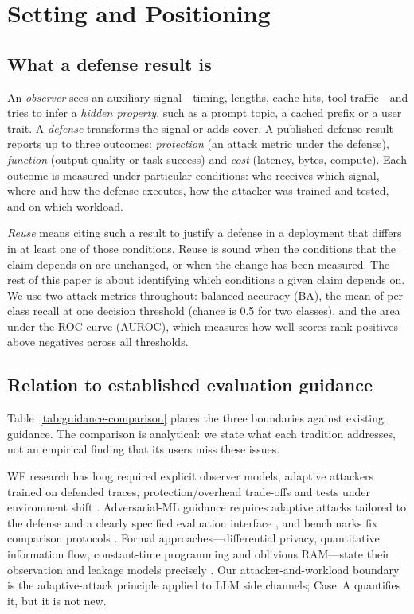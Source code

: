 \section{Setting and Positioning}\label{sec:positioning}\label{sec:background}
\subsection{What a defense result is}
An \emph{observer} sees an auxiliary signal---timing, lengths, cache hits, tool traffic---and tries to infer a \emph{hidden property}, such as a prompt topic, a cached prefix or a user trait. A \emph{defense} transforms the signal or adds cover. A published defense result reports up to three outcomes: \emph{protection} (an attack metric under the defense), \emph{function} (output quality or task success) and \emph{cost} (latency, bytes, compute). Each outcome is measured under particular conditions: who receives which signal, where and how the defense executes, how the attacker was trained and tested, and on which workload.

\emph{Reuse} means citing such a result to justify a defense in a deployment that differs in at least one of those conditions. Reuse is sound when the conditions that the claim depends on are unchanged, or when the change has been measured. The rest of this paper is about identifying which conditions a given claim depends on. We use two attack metrics throughout: balanced accuracy (BA), the mean of per-class recall at one decision threshold (chance is 0.5 for two classes), and the area under the ROC curve (AUROC), which measures how well scores rank positives above negatives across all thresholds.

\subsection{Relation to established evaluation guidance}
Table~\ref{tab:guidance-comparison} places the three boundaries against existing guidance. The comparison is analytical: we state what each tradition addresses, not an empirical finding that its users miss these issues.

WF research has long required explicit observer models, adaptive attackers trained on defended traces, protection/overhead trade-offs and tests under environment shift \cite{cai2014systematic,juarez2014critical,mathews2023critical,gong2021wfdefproxy}. Adversarial-ML guidance requires adaptive attacks tailored to the defense and a clearly specified evaluation interface \cite{carlini2019evaluating,tramer2020adaptive}, and benchmarks fix comparison protocols \cite{croce2021robustbench}. Formal approaches---differential privacy, quantitative information flow, constant-time programming and oblivious RAM---state their observation and leakage models precisely \cite{dwork2014foundations,smith2009qif,almeida2016constanttime,stefanov2013pathoram}. Our attacker-and-workload boundary is the adaptive-attack principle applied to LLM side channels; Case~A quantifies it, but it is not new.

